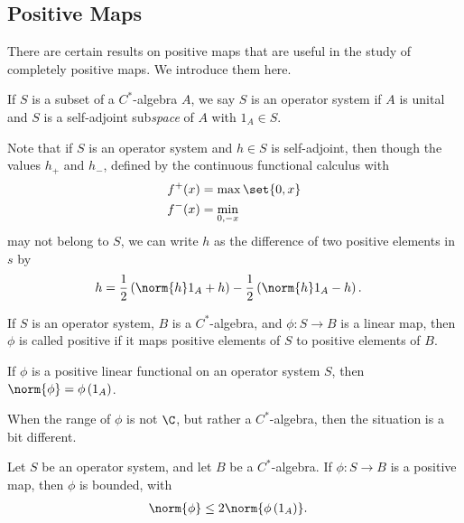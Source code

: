 \documentclass[10pt]{mypackage}
\begin{document}
\subsection{Positive Maps}%
There are certain results on positive maps that are useful in the study of completely positive maps. We introduce them here.
\begin{definition}
  If $S$ is a subset of a $C^{\ast}$-algebra $A$, we say $S$ is an operator system if $A$ is unital and $S$ is a self-adjoint sub\textit{space} of $A$ with $1_A\in S$.
\end{definition}
Note that if $S$ is an operator system and $h\in S$ is self-adjoint, then though the values $h_{+}$ and $h_{-}$, defined by the continuous functional calculus with
\begin{align*}
  f^+(x) &= \max\set{0,x}\\
  f^{-}(x) &= \min_{0,-x}
\end{align*}
may not belong to $S$, we can write $h$ as the difference of two positive elements in $s$ by
\begin{align*}
  h &= \frac{1}{2}\left( \norm{h}1_A + h \right) - \frac{1}{2}\left( \norm{h}1_A - h \right).
\end{align*}
\begin{definition}
  If $S$ is an operator system, $B$ is a $C^{\ast}$-algebra, and $\phi\colon S\rightarrow B$ is a linear map, then $\phi$ is called positive if it maps positive elements of $S$ to positive elements of $B$.
\end{definition}
\begin{theorem}
  If $\phi$ is a positive linear functional on an operator system $S$, then $\norm{\phi} = \phi\left( 1_A \right)$.
\end{theorem}
When the range of $\phi$ is not $\C$, but rather a $C^{\ast}$-algebra, then the situation is a bit different.
\begin{proposition}
  Let $S$ be an operator system, and let $B$ be a $C^{\ast}$-algebra. If $\phi\colon S\rightarrow B$ is a positive map, then $\phi$ is bounded, with
  \begin{align*}
    \norm{\phi} &\leq 2\norm{\phi\left( 1_A \right)}.
  \end{align*}
\end{proposition}
\end{document}
